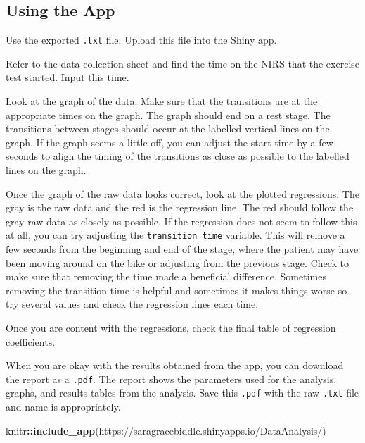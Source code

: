 \documentclass[
]{book}
\newenvironment{Shaded}{\begin{snugshade}}{\end{snugshade}}
\newcommand{\FunctionTok}[1]{\textcolor[rgb]{0.13,0.29,0.53}{\textbf{#1}}}
\newcommand{\NormalTok}[1]{#1}
\newcommand{\SpecialCharTok}[1]{\textcolor[rgb]{0.81,0.36,0.00}{\textbf{#1}}}
\newcommand{\StringTok}[1]{\textcolor[rgb]{0.31,0.60,0.02}{#1}}
\begin{document}
\hypertarget{using-the-app}{%
\subsection{Using the App}\label{using-the-app}}

Use the exported \texttt{.txt} file. Upload this file into the Shiny app.

Refer to the data collection sheet and find the time on the NIRS that the exercise test started. Input this time.

Look at the graph of the data. Make sure that the transitions are at the appropriate times on the graph. The graph should end on a rest stage. The transitions between stages should occur at the labelled vertical lines on the graph. If the graph seems a little off, you can adjust the start time by a few seconds to align the timing of the transitions as close as possible to the labelled lines on the graph.

Once the graph of the raw data looks correct, look at the plotted regressions. The gray is the raw data and the red is the regression line. The red should follow the gray raw data as closely as possible. If the regression does not seem to follow this at all, you can try adjusting the \texttt{transition\ time} variable. This will remove a few seconds from the beginning and end of the stage, where the patient may have been moving around on the bike or adjusting from the previous stage. Check to make sure that removing the time made a beneficial difference. Sometimes removing the transition time is helpful and sometimes it makes things worse so try several values and check the regression lines each time.

Once you are content with the regressions, check the final table of regression coefficients.

When you are okay with the results obtained from the app, you can download the report as a \texttt{.pdf}. The report shows the parameters used for the analysis, graphs, and results tables from the analysis. Save this \texttt{.pdf} with the raw \texttt{.txt} file and name is appropriately.

\begin{Shaded}
\begin{Highlighting}[]
\NormalTok{knitr}\SpecialCharTok{::}\FunctionTok{include\_app}\NormalTok{(}\StringTok{\textquotesingle{}https://saragracebiddle.shinyapps.io/DataAnalysis/\textquotesingle{}}\NormalTok{)}
\end{Highlighting}
\end{Shaded}
\end{document}
